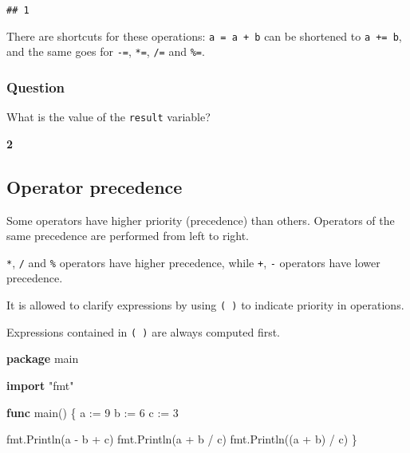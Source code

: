 \documentclass[]{book}
\newenvironment{Shaded}{\begin{snugshade}}{\end{snugshade}}
\newcommand{\DecValTok}[1]{\textcolor[rgb]{0.00,0.00,0.81}{#1}}
\newcommand{\KeywordTok}[1]{\textcolor[rgb]{0.13,0.29,0.53}{\textbf{#1}}}
\newcommand{\NormalTok}[1]{#1}
\newcommand{\StringTok}[1]{\textcolor[rgb]{0.31,0.60,0.02}{#1}}
\let\BeginKnitrBlock\begin \let\EndKnitrBlock\end
\begin{document}
\begin{verbatim}
## 1
\end{verbatim}

There are shortcuts for these operations: \texttt{a\ =\ a\ +\ b} can be shortened to \texttt{a\ +=\ b}, and the same goes for \texttt{-=}, \texttt{*=}, \texttt{/=} and \texttt{\%=}.

\hypertarget{question-11}{%
\subsubsection*{Question}\label{question-11}}

What is the value of the \texttt{result} variable?

\begin{Shaded}
\end{Shaded}

\textbf{2}

\hypertarget{operator-precedence}{%
\subsection{Operator precedence}\label{operator-precedence}}

Some operators have higher priority (precedence) than others. Operators of the
same precedence are performed from left to right.

\texttt{*}, \texttt{/} and \texttt{\%} operators have higher precedence, while \texttt{+}, \texttt{-} operators
have lower precedence.

It is allowed to clarify expressions by using \texttt{(\ )} to indicate priority in
operations.

\BeginKnitrBlock{rmdnote}
Expressions contained in \texttt{(\ )} are always computed first.
\EndKnitrBlock{rmdnote}

\begin{Shaded}
\begin{Highlighting}[]
\KeywordTok{package}\NormalTok{ main}

\KeywordTok{import} \StringTok{"fmt"}

\KeywordTok{func}\NormalTok{ main() \{}
\NormalTok{    a := }\DecValTok{9}
\NormalTok{    b := }\DecValTok{6}
\NormalTok{    c := }\DecValTok{3}

\NormalTok{    fmt.Println(a - b + c)}
\NormalTok{    fmt.Println(a + b / c)}
\NormalTok{    fmt.Println((a + b) / c)}
\NormalTok{\}}
\end{Highlighting}
\end{Shaded}
\end{document}

